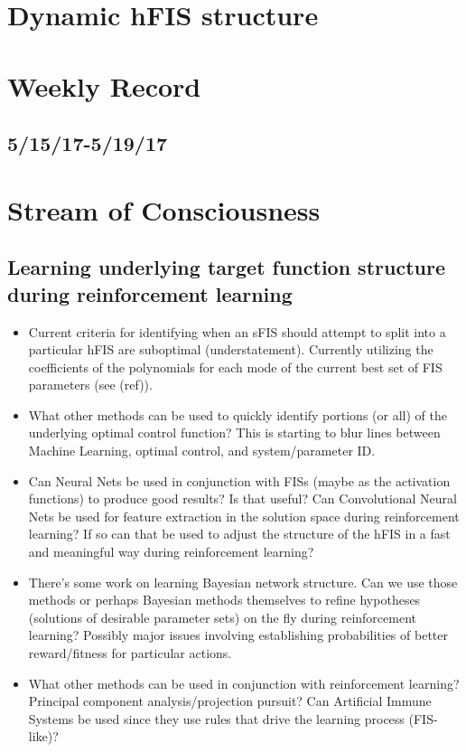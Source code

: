 \documentclass[11pt]{article} %
\begin{document}
\section{Dynamic hFIS structure}

\section{Weekly Record}
\subsection{5/15/17-5/19/17}

\section{Stream of Consciousness}
\subsection{Learning underlying target function structure during reinforcement learning}
\begin{itemize}
\item Current criteria for identifying when an sFIS should attempt to split into a particular hFIS are suboptimal (understatement). Currently utilizing the coefficients of the polynomials for each mode of the current best set of FIS parameters (see (ref)).
\item What other methods can be used to quickly identify portions (or all) of the underlying optimal control function? This is starting to blur lines between Machine Learning, optimal control, and system/parameter ID.
\item Can Neural Nets be used in conjunction with FISs (maybe as the activation functions) to produce good results? Is that useful? Can Convolutional Neural Nets be used for feature extraction in the solution space during reinforcement learning? If so can that be used to adjust the structure of the hFIS in a fast and meaningful way during reinforcement learning?
\item There's some work on learning Bayesian network structure. Can we use those methods or perhaps Bayesian methods themselves to refine hypotheses (solutions of desirable parameter sets) on the fly during reinforcement learning? Possibly major issues involving establishing probabilities of better reward/fitness for particular actions.
\item What other methods can be used in conjunction with reinforcement learning? Principal component analysis/projection pursuit? Can Artificial Immune Systems be used since they use rules that drive the learning process (FIS-like)?
\end{itemize}
\end{document}
